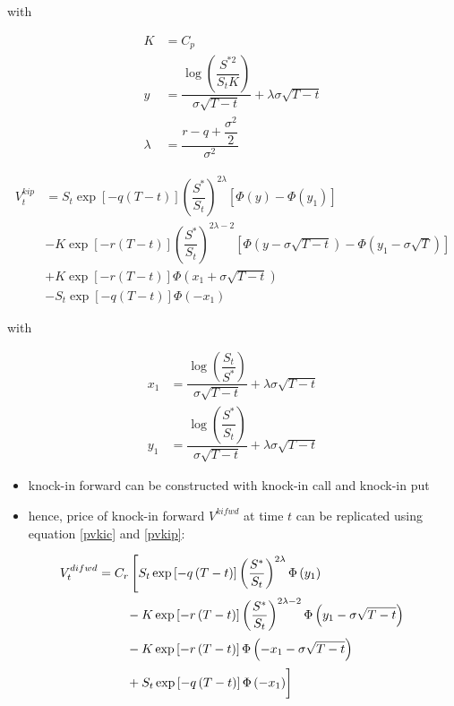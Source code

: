 with 

\begin{align*}
K &= C_p\\
y &= \dfrac{\log\left( \dfrac{S^{* 2}}{S_t K} \right)}{\sigma \sqrt{T-t}} + \lambda \sigma \sqrt{T-t}\\
\lambda &= \dfrac{r-q+\dfrac{\sigma^2}{2}}{\sigma^2}
\end{align*}

\begin{align} \label{pvkip}
V_t^{kip} &=  S_t \exp\left[ -q\left(T-t\right) \right] \left( \dfrac{S^*}{S_t} \right)^{2\lambda} \left[ \Phi\left(y\right) - \Phi\left(y_1 \right) \right]\nonumber\\
&- K \exp\left[ -r\left(T-t\right) \right] \left(\dfrac{S^*}{S_t}\right)^{2\lambda-2}\left[ \Phi\left( y- \sigma \sqrt{T-t} \right) -\Phi \left( y_1 - \sigma \sqrt{T} \right) \right] \nonumber\\
&+ K \exp\left[ - r \left(T-t\right) \right] \Phi \left( x_1 + \sigma \sqrt{T-t} \right)\nonumber\\
 &-S_t \exp\left[ -q \left(T-t\right) \right] \Phi\left( -x_1 \right)
\end{align}

with

\begin{align*}
x_1 &= \dfrac{\log\left(\dfrac{S_t}{S^*} \right)}{\sigma \sqrt{T-t}} + \lambda \sigma \sqrt{T-t}\\
y_1 &= \dfrac{\log\left(\dfrac{S^*}{S_t} \right)}{\sigma \sqrt{T-t}} + \lambda \sigma \sqrt{T-t}
\end{align*}

\begin{itemize}
\item knock-in forward can be constructed with knock-in call and knock-in put \citep{hull2006options}
\item hence, price of knock-in forward $V^{ kifwd }$ at time $t$ can be replicated using equation \ref{pvkic} and \ref{pvkip}:
\end{itemize}

\begin{align}
    V_t^{difwd} &= C_r \left[ S_t \exp\left[- q \left(T-t\right)\right]\left(\dfrac{S^*}{S_t}\right)^{2 \lambda} \Phi\left(y_1\right) \right.\nonumber\\
   &\qquad \left.\vphantom{\dfrac{S^*}{S_t}} - K \exp\left[- r \left(T-t\right)\right] \left(\dfrac{S^*}{S_t}\right)^{2 \lambda - 2} \Phi\left(y_1 - \sigma \sqrt{T-t}\right) \right.\nonumber\\
   &\qquad \left.\vphantom{\dfrac{S^*}{S_t}} - K \exp\left[- r \left(T-t\right)\right] \Phi\left(-x_1 - \sigma \sqrt{T-t}\right) \right.\nonumber\\
   &\qquad \left.\vphantom{\dfrac{S^*}{S_t}} + S_t \exp\left[- q \left(T-t\right)\right] \Phi\left(- x_1\right) \right] 
\end{align}

